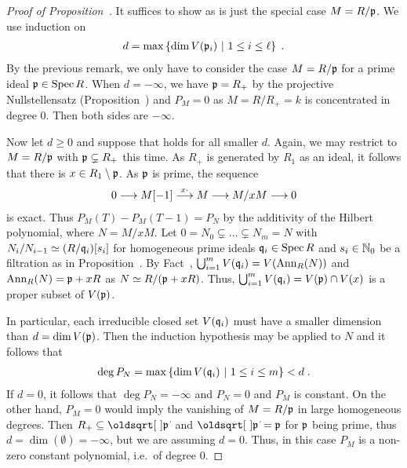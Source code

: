 \documentclass[a4paper,parskip=half,numbers=enddot, DIV=12, headheight=30pt]{scrreprt}
\begin{document}
\begin{proof}[Proof of Proposition~]
    It suffices to show   as  is just the special case $M=R/\mathfrak{p}$. We use induction on 
    \begin{align*}
	    d=\max\left\{\dim V(\mathfrak{p}_i)\ \middle|\  1\leq i\leq \ell\right\}\;.
    \end{align*}
    By the previous remark, we only have to consider the case $M=R/\mathfrak{p}$ for a prime ideal $\mathfrak{p}\in\operatorname{Spec} R$. When $d=-\infty$, we have $\mathfrak{p}=R_+$ by the projective Nullstellensatz (Proposition~) and $P_M=0$ as $M=R/R_+=k$ is concentrated in degree $0$. Then both sides are $-\infty$. 
    
    Now let $d\geq 0$ and suppose that  holds for all smaller $d$. Again, we may restrict to $M=R/\mathfrak{p}$ with $\mathfrak{p}\subsetneq R_+$ this time. As $R_+$ is generated by $R_1$ as an ideal, it follows that there is $x\in R_1\setminus \mathfrak{p}$. As $\mathfrak{p}$ is prime, the sequence
    \begin{align*}
        0 \morphism M[-1] \morphism[x\cdot] M \morphism M/x M \morphism 0
    \end{align*}
    is exact. Thus $P_M(T) -P_M(T-1) = P_N$ by the additivity of the Hilbert polynomial, where $N = M/xM $. Let $0 = N_0\subsetneq \ldots \subsetneq N_m = N$ with $N_i/N_{i-1} \simeq (R/\mathfrak{q}_i)[s_i]$ for homogeneous prime ideals $\mathfrak{q}_i\in \operatorname{Spec} R$  and $s_i\in \mathbb{N}_0$ be a filtration as in Proposition~. By Fact~, $\bigcup_{i=1}^m V(\mathfrak{q}_i) = V(\operatorname{Ann}_R(N))$ and $\operatorname{Ann}_R(N) = \mathfrak{p}+ xR$ as $N\simeq R/(\mathfrak{p}+xR)$. Thus, $\bigcup_{i=1}^m V(\mathfrak{q}_i) = V(\mathfrak{p})\cap V(x)$ is a proper subset of $V(\mathfrak{p})$. 
    
    In particular, each irreducible closed set $V(\mathfrak{q}_i)$ must have a smaller dimension than $d=\dim V(\mathfrak{p})$. Then the induction hypothesis may be applied to $N$ and it follows that 
    \begin{align*}
    	\deg P_N = \max\left\{\dim V(\mathfrak{q}_i)\ \middle|\  1\leq i \leq m\right\} < d\;.
    \end{align*}
    If $d=0$, it follows that $\deg P_N = -\infty$ and $P_N=0$ and $P_M$ is constant. On the other hand, $P_M = 0$ would imply the vanishing of $M=R/\mathfrak{p}$ in large homogeneous degrees. Then $R_+\subseteq\sqrt{\pp}$ and $\sqrt{\pp}=\pp$ for $\mathfrak{p}$ being prime, thus $d=\dim(\emptyset)=-\infty$, but we are assuming $d=0$. Thus, in this case $P_M$ is a non-zero constant polynomial, i.e.\ of degree $0$. 
    

\end{proof}
\end{document}

